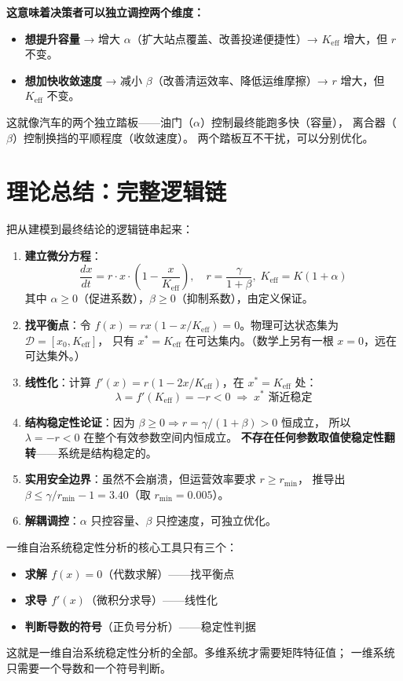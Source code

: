 \documentclass[12pt,a4paper]{article}
\begin{document}
\textbf{这意味着决策者可以独立调控两个维度：}
\begin{itemize}
  \item \textbf{想提升容量} → 增大 $\alpha$（扩大站点覆盖、改善投递便捷性）→ $K_{\text{eff}}$ 增大，但 $r$ 不变。
  \item \textbf{想加快收敛速度} → 减小 $\beta$（改善清运效率、降低运维摩擦）→ $r$ 增大，但 $K_{\text{eff}}$ 不变。
\end{itemize}

这就像汽车的两个独立踏板——油门（$\alpha$）控制最终能跑多快（容量），
离合器（$\beta$）控制换挡的平顺程度（收敛速度）。
两个踏板互不干扰，可以分别优化。

\section{理论总结：完整逻辑链}

把从建模到最终结论的逻辑链串起来：

\begin{enumerate}[label=\textbf{步骤 \arabic*}.]
  \item \textbf{建立微分方程}：
        \[
        \frac{dx}{dt} = r \cdot x \cdot \left(1 - \frac{x}{K_{\text{eff}}}\right), \quad r = \frac{\gamma}{1+\beta}, \; K_{\text{eff}} = K(1+\alpha)
        \]
        其中 $\alpha \geq 0$（促进系数），$\beta \geq 0$（抑制系数），由定义保证。

  \item \textbf{找平衡点}：令 $f(x) = r x (1 - x/K_{\text{eff}}) = 0$。物理可达状态集为 $\mathcal{D} = [x_0, K_{\text{eff}}]$，
        只有 $x^* = K_{\text{eff}}$ 在可达集内。（数学上另有一根 $x=0$，远在可达集外。）

  \item \textbf{线性化}：计算 $f'(x) = r(1 - 2x/K_{\text{eff}})$，在 $x^* = K_{\text{eff}}$ 处：
        \[
        \lambda = f'(K_{\text{eff}}) = -r < 0 \;\Rightarrow\; x^* \text{ 渐近稳定}
        \]
  \item \textbf{结构稳定性论证}：因为 $\beta \geq 0 \Rightarrow r = \gamma/(1+\beta) > 0$ 恒成立，
        所以 $\lambda = -r < 0$ 在整个有效参数空间内恒成立。
        \textbf{不存在任何参数取值使稳定性翻转}——系统是结构稳定的。

  \item \textbf{实用安全边界}：虽然不会崩溃，但运营效率要求 $r \geq r_{\min}$，
        推导出 $\beta \leq \gamma/r_{\min} - 1 = 3.40$（取 $r_{\min} = 0.005$）。

  \item \textbf{解耦调控}：$\alpha$ 只控容量、$\beta$ 只控速度，可独立优化。
\end{enumerate}

\begin{keypoint}[核心方法总结]
一维自治系统稳定性分析的核心工具只有三个：
\begin{itemize}
  \item \textbf{求解 $f(x) = 0$}（代数求解）——找平衡点
  \item \textbf{求导 $f'(x)$}（微积分求导）——线性化
  \item \textbf{判断导数的符号}（正负号分析）——稳定性判据
\end{itemize}
这就是一维自治系统稳定性分析的全部。多维系统才需要矩阵特征值；
一维系统只需要一个导数和一个符号判断。
\end{keypoint}
\end{document}
